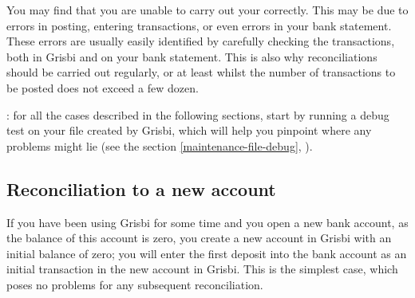 You may find that you are unable to carry out your  correctly. This may be due to errors in posting, entering transactions, or even errors in your bank statement. These errors are usually easily identified by carefully checking the transactions, both in Grisbi and on your bank statement. This is also why reconciliations should be carried out regularly, or at least whilst the number of transactions to be posted does not exceed a few dozen.

\Note{}: for all the cases described in the following sections, start by running a debug test on your file created by Grisbi, which will help you pinpoint where any problems might lie (see the section \vref{maintenance-file-debug}, ).


\subsection{Reconciliation to a new account\label{reconciliation-solve-new}}

If you have been using Grisbi for some time and you open a new bank account, as the balance of this account is zero, you create a new account in Grisbi with an initial balance of zero; you will enter the first deposit into the bank account as an initial transaction in the new account in Grisbi. This is the simplest case, which poses no problems for any subsequent reconciliation.


